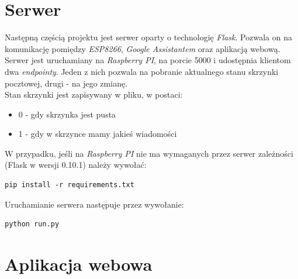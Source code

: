 \begin{center}
\end{center}

\section{Serwer}

Następną częścią projektu jest serwer oparty o technologię \textit{Flask}. Pozwala on na komunikację pomiędzy \textit{ESP8266}, \textit{Google Assistantem} oraz aplikacją webową.\\

Serwer jest uruchamiany na \textit{Raspberry PI}, na porcie 5000 i udostępnia klientom dwa \textit{endpointy}. Jeden z nich pozwala na pobranie aktualnego stanu skrzynki pocztowej, drugi - na jego zmianę. \\

Stan skrzynki jest zapisywany w pliku, w postaci:
\begin{itemize}
\item 0 - gdy skrzynka jest pusta
\item 1 - gdy w skrzynce mamy jakieś wiadomości
\end{itemize}

W przypadku, jeśli na \textit{Raspberry PI} nie ma wymaganych przez serwer zależności (Flask w wersji 0.10.1) należy wywołać:
\begin{lstlisting}
pip install -r requirements.txt
\end{lstlisting}

Uruchamianie serwera następuje przez wywołanie:
\begin{lstlisting}
python run.py
\end{lstlisting}


\section{Aplikacja webowa}

\begin{center}
	\label{img:skrzynka}
\end{center}

